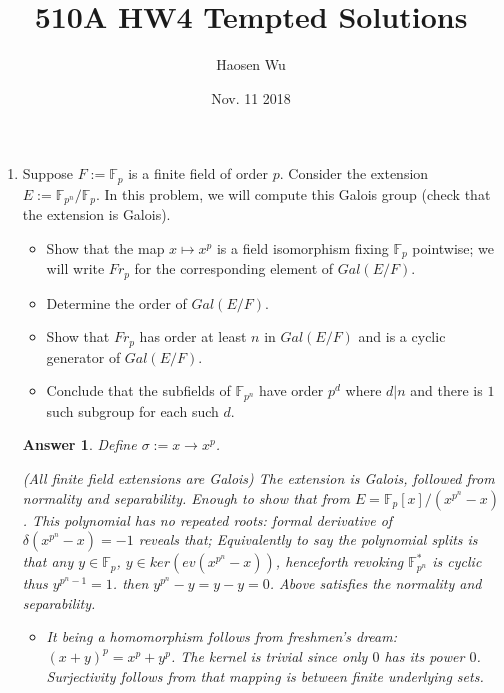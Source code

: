 \documentclass[11pt,leqno]{article}
\newcommand{\F}{{\mathbb F}}
\newcommand{\<}[1]{{\langle}#1 {\rangle}}
\newcommand{\F}{{\mathcal F}}
\theoremstyle{plain}
\newtheorem*{answer*}{Answer}
\theoremstyle{definition}
\theoremstyle{remark}
\numberwithin{equation}{section}
\begin{document}
\pagestyle{fancy}
\renewcommand{\sectionmark}[1]{\markright{\thesection\ #1}}
\fancyhead{}
\fancyhead[LO,R]{\bfseries\footnotesize\thepage}
\fancyhead[LE]{\bfseries\footnotesize\rightmark}
\fancyhead[RO]{\bfseries\footnotesize\rightmark}
\chead[]{}
\cfoot[]{}
\setlength{\headheight}{1cm}

\author{Haosen Wu}
\title{{\bf 510A HW4 Tempted Solutions}}
\date{Nov. 11 2018}

\maketitle
\begin{enumerate}
\item Suppose $F := {\mathbb F}_p$ is a finite field of order $p$.  Consider the extension $E := {\mathbb F}_{p^n}/{\mathbb F}_p$.  In this problem, we will compute this Galois group (check that the extension is Galois).
    \begin{itemize}
    \item Show that the map $x \mapsto x^p$ is a field isomorphism fixing ${\mathbb F}_p$ pointwise; we will write $Fr_p$ for the corresponding element of $Gal(E/F)$.
    \item Determine the order of $Gal(E/F)$.
    \item Show that $Fr_p$ has order at least $n$ in $Gal(E/F)$ and is a cyclic generator of $Gal(E/F)$.
    \item Conclude that the subfields of ${\mathbb F}_{p^n}$ have order $p^d$ where $d | n$ and there is $1$ such subgroup for each such $d$.
    \end{itemize}
    
    \begin{answer*}
    \smallskip
    Define $\sigma:= x \rightarrow x^p$.
    
    (All finite field extensions are Galois) The extension is Galois, followed from normality and separability. Enough to show that from  $E=\F_p[x]/(x^{p^n}-x)$. This polynomial has no repeated roots: formal derivative of $\delta(x^{p^n}-x)=-1$ reveals that; Equivalently to say the polynomial splits is that any $y\in \F_p$, $y\in ker(ev(x^{p^n}-x))$, henceforth revoking $\F_{p^n}^*$ is cyclic thus $y^{p^n-1}=1$. then $y^{p^n}-y=y-y=0$. Above satisfies the  normality and separability.
    
        \begin{itemize} 
        
            \item [i)] It being a homomorphism follows from freshmen's dream: $(x+y)^p=x^p+y^p$. The kernel is trivial since only $0$ has its power $0$. Surjectivity follows from that mapping is between finite underlying sets.
            

\end{itemize}
\end{answer*}
\end{enumerate}
\end{document}
